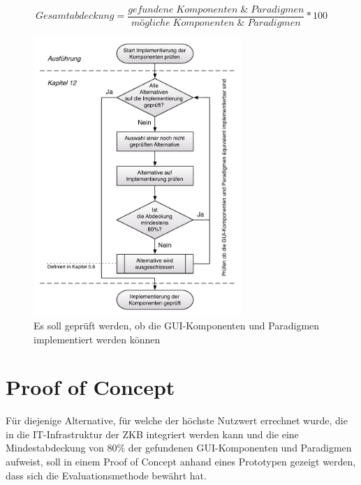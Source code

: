   \begin{equation}
    \label{eq:AbdeckungGuiTotal}
    Gesamtabdeckung = \frac
    	{gefundene\;Komponenten\;\&\;Paradigmen}
    	{mögliche\;Komponenten\;\&\;Paradigmen} * 100
  \end{equation} 

  \begin{figure}[h!]
    \begin{center}
      \includegraphics[width=0.7\textwidth]{./image/implementierungPruefen.pdf}
      \caption{Es soll geprüft werden, ob die GUI-Komponenten und Paradigmen
      implementiert werden können}
      \label{img:implementierungPruefen}
    \end{center}
  \end{figure}  
  
  \section{Proof of Concept}
  
  Für diejenige Alternative, für welche der höchste Nutzwert errechnet wurde,
  die in die IT-Infrastruktur der \ac{ZKB} integriert werden kann und die eine
  Mindestabdeckung von 80\% der gefundenen GUI-Komponenten und Paradigmen
  aufweist, soll in einem Proof of Concept anhand eines Prototypen gezeigt
  werden, dass sich die Evaluationsmethode bewährt hat.
  
